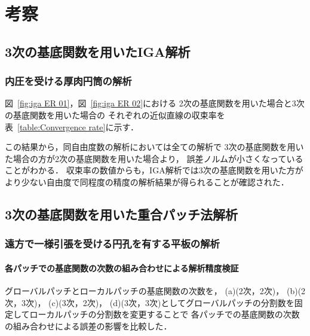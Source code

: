 \chapter{考察}
\section{3次の基底関数を用いたIGA解析}
\subsection{内圧を受ける厚肉円筒の解析}

図~\ref{fig:iga ER 01}，図~\ref{fig:iga ER 02}における
2次の基底関数を用いた場合と3次の基底関数を用いた場合の
それぞれの近似直線の収束率を表~\ref{table:Convergence rate}に示す．

\begin{table}[hbtp]
  \caption{Convergence rate}
  \label{table:Convergence rate}
  \centering
\end{table}

\noindent
この結果から，同自由度数の解析においては全ての解析で
3次の基底関数を用いた場合の方が2次の基底関数を用いた場合より，
誤差ノルムが小さくなっていることがわかる．
収束率の数値からも，IGA解析では3次の基底関数を用いた方が
より少ない自由度で同程度の精度の解析結果が得られることが確認された．

\section{3次の基底関数を用いた重合パッチ法解析}
\subsection{遠方で一様引張を受ける円孔を有する平板の解析}
\subsubsection{各パッチでの基底関数の次数の組み合わせによる解析精度検証}
グローバルパッチとローカルパッチの基底関数の次数を，
(a)(2次，2次)，
(b)(2次，3次)，
(c)(3次，2次)，
(d)(3次，3次)としてグローバルパッチの分割数を固定してローカルパッチの分割数を変更することで
各パッチでの基底関数の次数の組み合わせによる誤差の影響を比較した．

